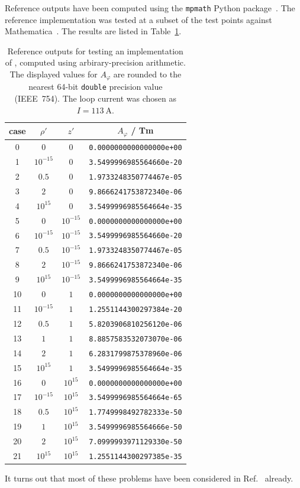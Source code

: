Reference outputs have been computed using the \texttt{mpmath} Python package~\cite{mpmath}.
The reference implementation was tested at a subset of the test points against Mathematica~\cite{Mathematica}.
The results are listed in Table~\ref{tab:ref_cylWireLoop}.
\begin{table}[htbp]
  \centering
  \begin{tabular}{c|c|c|c}
    case & $\rho'$ & $z'$ & $A_\varphi$ / Tm \\
    \hline
     0 & $0$        & $0$        & \texttt{0.0000000000000000e+00} \\
     1 & $10^{-15}$ & $0$        & \texttt{3.5499996985564660e-20} \\
     2 & $0.5$      & $0$        & \texttt{1.9733248350774467e-05} \\
     3 & $2$        & $0$        & \texttt{9.8666241753872340e-06} \\
     4 & $10^{15}$  & $0$        & \texttt{3.5499996985564664e-35} \\
     5 & $0$        & $10^{-15}$ & \texttt{0.0000000000000000e+00} \\
     6 & $10^{-15}$ & $10^{-15}$ & \texttt{3.5499996985564660e-20} \\
     7 & $0.5$      & $10^{-15}$ & \texttt{1.9733248350774467e-05} \\
     8 & $2$        & $10^{-15}$ & \texttt{9.8666241753872340e-06} \\
     9 & $10^{15}$  & $10^{-15}$ & \texttt{3.5499996985564664e-35} \\
    10 & $0$        & $1$        & \texttt{0.0000000000000000e+00} \\
    11 & $10^{-15}$ & $1$        & \texttt{1.2551144300297384e-20} \\
    12 & $0.5$      & $1$        & \texttt{5.8203906810256120e-06} \\
    13 & $1$        & $1$        & \texttt{8.8857583532073070e-06} \\
    14 & $2$        & $1$        & \texttt{6.2831799875378960e-06} \\
    15 & $10^{15}$  & $1$        & \texttt{3.5499996985564664e-35} \\
    16 & $0$        & $10^{15}$  & \texttt{0.0000000000000000e+00} \\
    17 & $10^{-15}$ & $10^{15}$  & \texttt{3.5499996985564664e-65} \\
    18 & $0.5$      & $10^{15}$  & \texttt{1.7749998492782333e-50} \\
    19 & $1$        & $10^{15}$  & \texttt{3.5499996985564666e-50} \\
    20 & $2$        & $10^{15}$  & \texttt{7.0999993971129330e-50} \\
    21 & $10^{15}$  & $10^{15}$  & \texttt{1.2551144300297385e-35}
  \end{tabular}
  \caption{Reference outputs for testing an implementation of , computed using arbirary-precision arithmetic.
           The displayed values for $A_\varphi$ are rounded to the nearest 64-bit \texttt{double} precision value (IEEE~754).
           The loop current was chosen as $I = \SI{113}{\ampere}$.}
  \label{tab:ref_cylWireLoop}
\end{table}

It turns out that most of these problems have been considered in Ref.~\cite{walstrom_2017} already.
